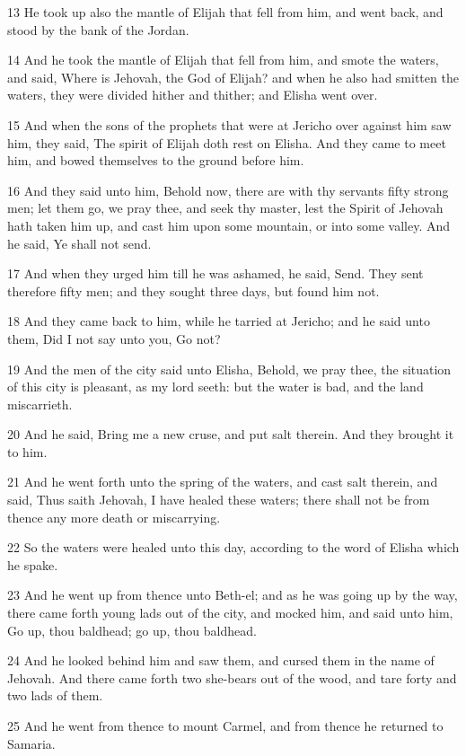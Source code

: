 \par 13 He took up also the mantle of Elijah that fell from him, and went back, and stood by the bank of the Jordan.
\par 14 And he took the mantle of Elijah that fell from him, and smote the waters, and said, Where is Jehovah, the God of Elijah? and when he also had smitten the waters, they were divided hither and thither; and Elisha went over.
\par 15 And when the sons of the prophets that were at Jericho over against him saw him, they said, The spirit of Elijah doth rest on Elisha. And they came to meet him, and bowed themselves to the ground before him.
\par 16 And they said unto him, Behold now, there are with thy servants fifty strong men; let them go, we pray thee, and seek thy master, lest the Spirit of Jehovah hath taken him up, and cast him upon some mountain, or into some valley. And he said, Ye shall not send.
\par 17 And when they urged him till he was ashamed, he said, Send. They sent therefore fifty men; and they sought three days, but found him not.
\par 18 And they came back to him, while he tarried at Jericho; and he said unto them, Did I not say unto you, Go not?
\par 19 And the men of the city said unto Elisha, Behold, we pray thee, the situation of this city is pleasant, as my lord seeth: but the water is bad, and the land miscarrieth.
\par 20 And he said, Bring me a new cruse, and put salt therein. And they brought it to him.
\par 21 And he went forth unto the spring of the waters, and cast salt therein, and said, Thus saith Jehovah, I have healed these waters; there shall not be from thence any more death or miscarrying.
\par 22 So the waters were healed unto this day, according to the word of Elisha which he spake.
\par 23 And he went up from thence unto Beth-el; and as he was going up by the way, there came forth young lads out of the city, and mocked him, and said unto him, Go up, thou baldhead; go up, thou baldhead.
\par 24 And he looked behind him and saw them, and cursed them in the name of Jehovah. And there came forth two she-bears out of the wood, and tare forty and two lads of them.
\par 25 And he went from thence to mount Carmel, and from thence he returned to Samaria.

